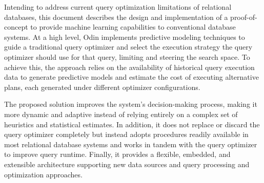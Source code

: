 Intending to address current query optimization limitations of relational databases, this document describes the design and implementation of a proof-of-concept to provide machine learning capabilities to conventional database systems. At a high level, Odin implements predictive modeling techniques to guide a traditional query optimizer and select the execution strategy the query optimizer should use for that query, limiting and steering the search space. To achieve this, the approach relies on the availability of historical query execution data to generate predictive models and estimate the cost of executing alternative plans, each generated under different optimizer configurations.

The proposed solution improves the system's decision-making process, making it more dynamic and adaptive instead of relying entirely on a complex set of heuristics and statistical estimates. In addition, it does not replace or discard the query optimizer completely but instead adopts procedures readily available in most relational database systems and works in tandem with the query optimizer to improve query runtime. Finally, it provides a flexible, embedded, and extensible architecture supporting new data sources and query processing and optimization approaches. 